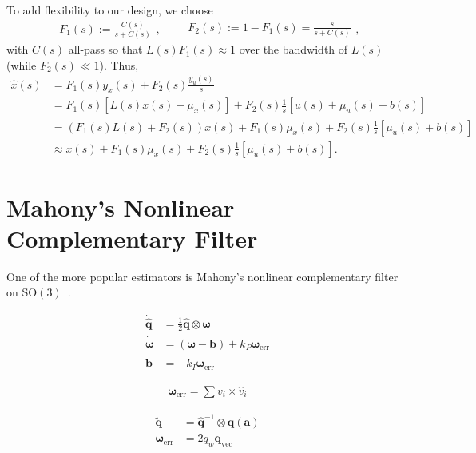 \documentclass[a4paper]{article}
\begin{document}
To add flexibility to our design, we choose
\begin{equation}
\begin{split}
F_1(s) := \frac{C(s)}{s + C(s)}
\end{split},
\qquad
\begin{split}
F_2(s) := 1 - F_1(s) = \frac{s}{s + C(s)}
\end{split},
\end{equation}
with $C(s)$ all-pass so that $L(s)F_1(s)\approx1$ over the bandwidth of $L(s)$ (while $F_2(s)\ll1$).
Thus,
\begin{align}
\hat{x}(s) &= F_1(s)y_x(s) + F_2(s)\frac{y_u(s)}{s} \nonumber \\
           &= F_1(s)\left[L(s)x(s) + \mu_x(s)\right] + F_2(s)\frac{1}{s}\left[u(s) + \mu_u(s) + b(s)\right] \nonumber \\
           &= (F_1(s)L(s)+F_2(s))x(s) + F_1(s)\mu_x(s) + F_2(s)\frac{1}{s}\left[\mu_u(s) + b(s)\right] \nonumber \\
           &\approx x(s) + F_1(s)\mu_x(s) + F_2(s)\frac{1}{s}\left[\mu_u(s) + b(s)\right].
\end{align}

\section*{Mahony's Nonlinear Complementary Filter}
One of the more popular estimators is Mahony's nonlinear complementary filter on $\mathrm{SO}(3)$~\cite{Mahony2008}.

\begin{align}
  \dot{\bm{\hat{q}}} &= \frac{1}{2} \hat{\bm q} \otimes \bm{\bar \omega} \\
  \dot{\bm{\bar \omega}} &= (\bm{\omega} - \bm{b}) + k_P\bm{\omega}_\text{err} \\
  \dot{\bm{b}} &= -k_I\bm{\omega}_\text{err}
\end{align}

\begin{align}
  \bm{\omega}_\text{err} = \sum v_i \times \hat{v}_i
\end{align}

\begin{align}
  \tilde{\bm{q}} &= \hat{\bm q}^{-1} \otimes \bm{q}(\bm{a}) \\
  \bm{\omega}_\text{err} &= 2 q_w \bm{q}_\text{vec}
\end{align}



\end{document}

